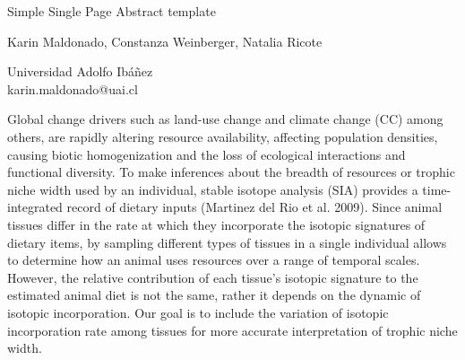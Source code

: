\documentclass[a4paper]{article}
\begin{document}

\Large
 \begin{center}
Simple Single Page Abstract template\\ 

\hspace{10pt}

\large
Karin Maldonado, Constanza Weinberger, Natalia Ricote\\

\hspace{10pt}

\small  
Universidad Adolfo Ibáñez\\
karin.maldonado@uai.cl\\

\end{center}

\hspace{10pt}

\normalsize

Global change drivers such as land-use change and climate change (CC) among others, are rapidly altering resource availability, affecting population densities, causing biotic homogenization and the loss of ecological interactions and functional diversity. To make inferences about the breadth of resources or trophic niche width used by an individual, stable isotope analysis (SIA) provides a time-integrated record of dietary inputs (Martinez del Rio et al. 2009). Since animal tissues differ in the rate at which they incorporate the isotopic signatures of dietary items, by sampling different types of tissues in a single individual allows to determine how an animal uses resources over a range of temporal scales. However, the relative contribution of each tissue's isotopic signature to the estimated animal diet is not the same, rather it depends on the dynamic of isotopic incorporation. Our goal is to include the variation of isotopic incorporation rate among tissues for more accurate interpretation of trophic niche width.
\end{document}
